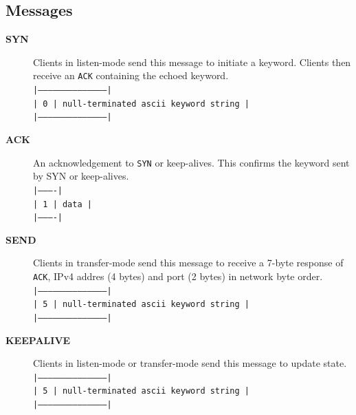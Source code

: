 \documentclass{article}
\begin{document}
\subsection{Messages}
\begin{description}
\item[\textbf{SYN}] Clients in listen-mode send this message to initiate a keyword. Clients then receive an \texttt{ACK} containing the echoed keyword.  \\
\texttt{|------------------------------------------| } \\
\texttt{| 0 | null-terminated ascii keyword string | } \\
\texttt{|------------------------------------------| } \\
\item[\textbf{ACK}] An acknowledgement to \texttt{SYN} or keep-alives.
This confirms the keyword sent by SYN or keep-alives. \\
\texttt{|----------| } \\
\texttt{| 1 | data | } \\
\texttt{|----------| } \\
\item[\textbf{SEND}] Clients in transfer-mode send this message to receive a 7-byte response of \texttt{ACK}, IPv4 addres (4 bytes) and port (2 bytes) in network byte order. \\
\texttt{|------------------------------------------| } \\
\texttt{| 5 | null-terminated ascii keyword string | } \\
\texttt{|------------------------------------------| } \\
\item[\textbf{KEEPALIVE}] Clients in listen-mode or transfer-mode send this message to update state. \\
\texttt{|------------------------------------------| } \\
\texttt{| 5 | null-terminated ascii keyword string | } \\
\texttt{|------------------------------------------| } \\
\end{description}

\clearpage
\end{document}
